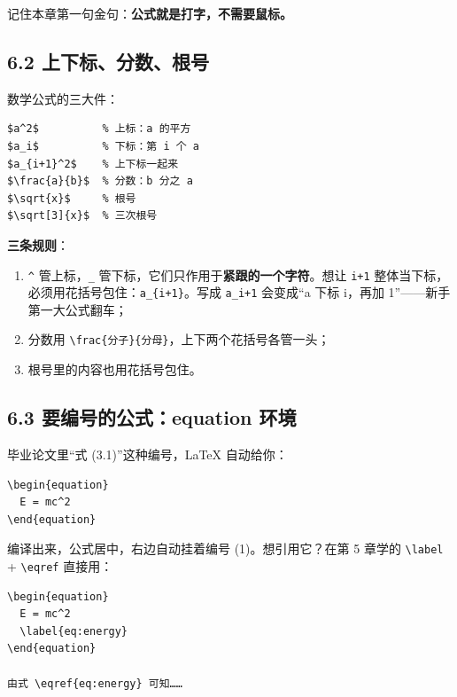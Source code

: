 记住本章第一句金句：\textbf{公式就是打字，不需要鼠标。}

\subsection*{6.2 上下标、分数、根号}

数学公式的三大件：

\begin{lstlisting}
$a^2$          % 上标：a 的平方
$a_i$          % 下标：第 i 个 a
$a_{i+1}^2$    % 上下标一起来
$\frac{a}{b}$  % 分数：b 分之 a
$\sqrt{x}$     % 根号
$\sqrt[3]{x}$  % 三次根号
\end{lstlisting}

\textbf{三条规则}：

\begin{enumerate}
\setlength{\itemsep}{2pt}
\item \texttt{\textasciicircum{}} 管上标，\texttt{\_} 管下标，它们只作用于\textbf{紧跟的一个字符}。想让 \texttt{i+1} 整体当下标，必须用花括号包住：\texttt{a\_\{i+1\}}。写成 \texttt{a\_i+1} 会变成“a 下标 i，再加 1”——新手第一大公式翻车；
\item 分数用 \texttt{\textbackslash{}frac\{分子\}\{分母\}}，上下两个花括号各管一头；
\item 根号里的内容也用花括号包住。
\end{enumerate}

\subsection*{6.3 要编号的公式：equation 环境}

毕业论文里“式 (3.1)”这种编号，LaTeX 自动给你：

\begin{lstlisting}
\begin{equation}
  E = mc^2
\end{equation}
\end{lstlisting}

编译出来，公式居中，右边自动挂着编号 (1)。想引用它？在第 5 章学的 \texttt{\textbackslash{}label} + \texttt{\textbackslash{}eqref} 直接用：

\begin{lstlisting}
\begin{equation}
  E = mc^2
  \label{eq:energy}
\end{equation}

由式 \eqref{eq:energy} 可知……
\end{lstlisting}

